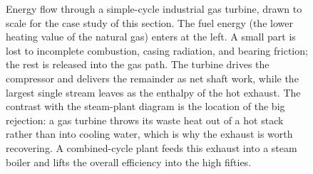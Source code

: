 \begin{figure}[htbp]
\caption[Energy flow through a simple-cycle gas turbine]{Energy flow through a
simple-cycle industrial gas turbine, drawn to scale for the case study of this
section. The fuel energy (the lower heating value of the natural gas) enters at
the left. A small part is lost to incomplete combustion, casing radiation, and
bearing friction; the rest is released into the gas path. The turbine drives
the compressor and delivers the remainder as net shaft work, while the largest
single stream leaves as the enthalpy of the hot exhaust. The contrast with the
steam-plant diagram is the location of the big rejection: a gas turbine throws
its waste heat out of a hot stack rather than into cooling water, which is why
the exhaust is worth recovering. A combined-cycle plant feeds this exhaust into
a steam boiler and lifts the overall efficiency into the high fifties.}
\label{fig:vol04ch01:gasturbine-sankey}
\end{figure}
